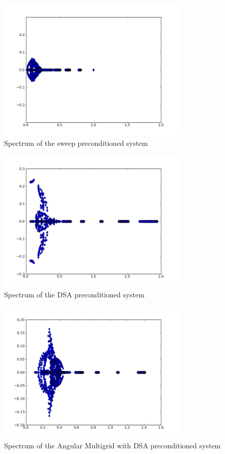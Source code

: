 \documentclass[preprint,10pt]{elsarticle}
\renewcommand{\(}{\left(}
\renewcommand{\)}{\right)}
\renewcommand{\[}{\left[}
\renewcommand{\]}{\right]}
\begin{document}
\begin{figure}[H]
\centering
\includegraphics[width=9cm]{s8_5_5.png}
\caption{Spectrum of the sweep preconditioned system}
\label{fig:spectrum_sweep}
\end{figure}

\begin{figure}[H]
\centering
\includegraphics[width=9cm]{d_s8_5_5.png}
\caption{Spectrum of the DSA preconditioned system}
\label{fig:spectrum_DSA}
\end{figure}

\begin{figure}[H]
\centering
\includegraphics[width=9cm]{p_s8_5_5.png}
\caption{Spectrum of the Angular Multigrid with DSA preconditioned system}
\label{fig:spectrum_ANMG}
\end{figure}
\end{document}
